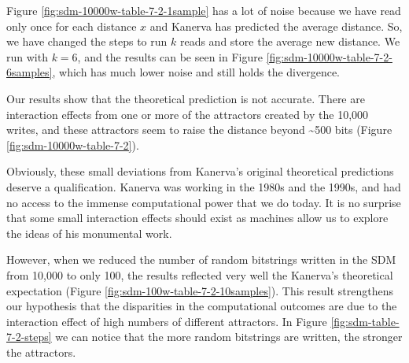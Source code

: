 Figure \ref{fig:sdm-10000w-table-7-2-1sample} has a lot of noise because we have read only once for each distance $x$ and Kanerva has predicted the average distance. So, we have changed the steps to run $k$ reads and store the average new distance. We run with $k=6$, and the results can be seen in Figure \ref{fig:sdm-10000w-table-7-2-6samples}, which has much lower noise and still holds the divergence.

Our results show that the theoretical prediction is not accurate.  There are interaction effects from one or more of the attractors created by the 10,000 writes, and these attractors seem to raise the distance beyond \textasciitilde 500 bits (Figure \ref{fig:sdm-10000w-table-7-2}).

Obviously, these small deviations from Kanerva's original theoretical predictions deserve a qualification.  Kanerva was working in the 1980s and the 1990s, and had no access to the immense computational power that we do today. It is no surprise that some small interaction effects should exist as machines allow us to explore the ideas of his monumental work.

However, when we reduced the number of random bitstrings written in the SDM from 10,000 to only 100, the results reflected very well the Kanerva's theoretical expectation (Figure \ref{fig:sdm-100w-table-7-2-10samples}). This result strengthens our hypothesis that the disparities in the computational outcomes are due to the interaction effect of high numbers of different attractors. In Figure \ref{fig:sdm-table-7-2-steps} we can notice that the more random bitstrings are written, the stronger the attractors.

